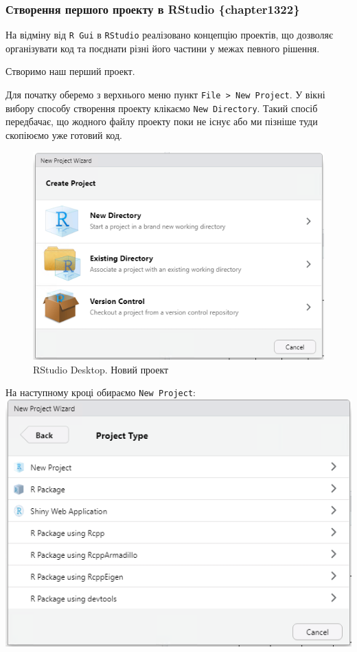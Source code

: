 \documentclass[
]{book}
\begin{document}
\hypertarget{ux441ux442ux432ux43eux440ux435ux43dux43dux44f-ux43fux435ux440ux448ux43eux433ux43e-ux43fux440ux43eux435ux43aux442ux443-ux432-rstudio-chapter1322}{%
\subsubsection{Створення першого проекту в RStudio \{chapter1322\}}\label{ux441ux442ux432ux43eux440ux435ux43dux43dux44f-ux43fux435ux440ux448ux43eux433ux43e-ux43fux440ux43eux435ux43aux442ux443-ux432-rstudio-chapter1322}}

На відміну від \texttt{R\ Gui} в \texttt{RStudio} реалізовано концепцію проектів, що дозволяє організувати код та поєднати різні його частини у межах певного рішення.

Створимо наш перший проект.

Для початку оберемо з верхнього меню пункт \texttt{File\ \textgreater{}\ New\ Project}. У вікні вибору способу створення проекту клікаємо \texttt{New\ Directory}. Такий спосіб передбачає, що жодного файлу проекту поки не існує або ми пізніше туди скопіюємо уже готовий код.

\begin{figure}
\centering
\includegraphics{images/chapter1/rstudio_6.png}
\caption{\label{fig:unnamed-chunk-17}RStudio Desktop. Новий проект}
\end{figure}

На наступному кроці обираємо \texttt{New\ Project}:
\includegraphics{images/chapter1/rstudio_7.png}
\end{document}
